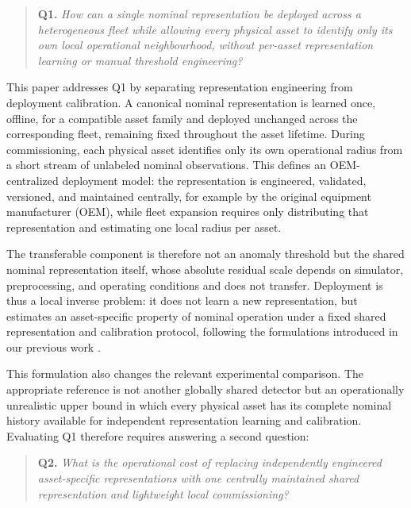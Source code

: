 \documentclass{trbunofficial}
\begin{document}
\begin{quote}
\textbf{Q1.} \emph{How can a single nominal representation be deployed across a heterogeneous
fleet while allowing every physical asset to identify only its own local operational
neighbourhood, without per-asset representation learning or manual threshold engineering?}
\end{quote}

This paper addresses Q1 by separating representation engineering from deployment calibration. A
canonical nominal representation is learned once, offline, for a compatible asset family and
deployed unchanged across the corresponding fleet, remaining fixed throughout the asset lifetime.
During commissioning, each physical asset identifies only its own operational radius from a short
stream of unlabeled nominal observations. This defines an OEM-centralized deployment model: the
representation is engineered, validated, versioned, and maintained centrally, for example by the
original equipment manufacturer (OEM), while fleet expansion requires only distributing that
representation and estimating one local radius per asset.

The transferable component is therefore not an anomaly threshold but the shared nominal
representation itself, whose absolute residual scale depends on simulator, preprocessing, and
operating conditions and does not transfer. Deployment is thus a local inverse problem: it does
not learn a new representation, but estimates an asset-specific property of nominal operation
under a fixed shared representation and calibration protocol, following the formulations
introduced in our previous work \citep{disanti2026quotient,disanti2026inverse}.


This formulation also changes the relevant experimental comparison. The appropriate reference is
not another globally shared detector but an operationally unrealistic upper bound in which every
physical asset has its complete nominal history available for independent representation learning
and calibration. Evaluating Q1 therefore requires answering a second question:

\begin{quote}
\textbf{Q2.} \emph{What is the operational cost of replacing independently engineered
asset-specific representations with one centrally maintained shared representation and
lightweight local commissioning?}
\end{quote}
\end{document}
